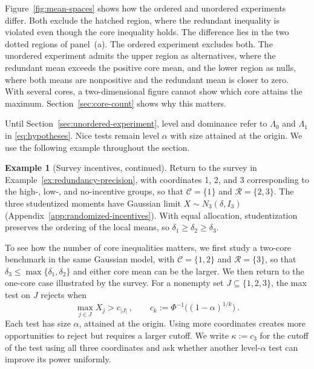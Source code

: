 \documentclass[11pt]{article}
\newcommand{\rev}[1]{\textcolor{blue}{#1}}
\numberwithin{equation}{section}
\theoremstyle{definition}
\newtheorem{example}{Example}
\begin{document}
Figure~\ref{fig:mean-spaces} shows how the ordered and unordered experiments differ. Both exclude the hatched region, where the redundant inequality is violated even though the core inequality holds. The difference lies in the two dotted regions of panel~(a). The ordered experiment excludes both. The unordered experiment admits the upper region as alternatives, where the redundant mean exceeds the positive core mean, and the lower region as nulls, where both means are nonpositive and the redundant mean is closer to zero. With several cores, a two-dimensional figure cannot show which core attains the maximum. Section~\ref{sec:core-count} shows why this matters.

Until Section~\ref{sec:unordered-experiment}, level and dominance refer to $\Lambda_0$ and $\Lambda_1$ in \eqref{eq:hypotheses}. Nice tests remain level $\alpha$ with size attained at the origin. We use the following example throughout the section.

\begin{example}[Survey incentives, continued]\label{ex:three-coordinates}
  Return to the survey in Example~\ref{ex:redundancy-precision}, with coordinates 1, 2, and 3 corresponding to the high-, low-, and no-incentive groups, so that $\mathcal C=\{1\}$ and $\mathcal R=\{2,3\}$. The three studentized moments have Gaussian limit $X\sim N_3(\delta,I_3)$ (Appendix~\ref{app:randomized-incentives}). With equal allocation, studentization preserves the ordering of the local means, so $\delta_1\ge\delta_2\ge\delta_3$.
  
  To see how the number of core inequalities matters, we first study a two-core benchmark in the same Gaussian model, with $\mathcal C=\{1,2\}$ and $\mathcal R=\{3\}$, so that $\delta_3\le\max\{\delta_1,\delta_2\}$ and either core mean can be the larger. We then return to the one-core case illustrated by the survey. For a nonempty set $J\subseteq\{1,2,3\}$, the max test on $J$ rejects when
  \[
  \max_{j\in J}X_j>c_{|J|}~,
  \qquad
  c_k:=\Phi^{-1}\big((1-\alpha)^{1/k}\big)~.
  \]
  Each test has size $\alpha$, attained at the origin. Using more coordinates creates more opportunities to reject but requires a larger cutoff. We write $\kappa:=c_3$ for the cutoff of the test using all three coordinates and ask whether another level-$\alpha$ test can improve its power uniformly.
  \end{example}
\end{document}
